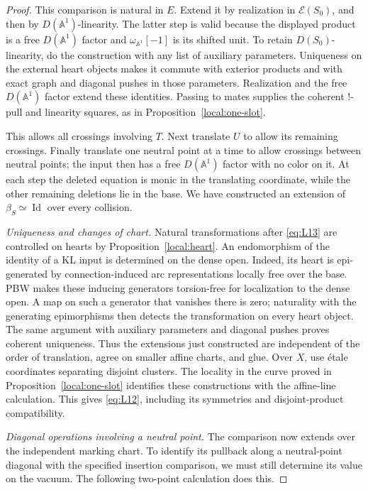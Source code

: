 \documentclass[11pt]{article}
\numberwithin{equation}{section}
\theoremstyle{definition}
\theoremstyle{remark}
\begin{document}
\begin{proof}
This comparison is natural in $E$.  Extend it by realization in
$\mathcal E(S_0)$, and then by $D(\mathbb A^1)$-linearity.  The latter
step is valid because the displayed product is a free
$D(\mathbb A^1)$ factor and $\omega_{\mathbb A^1}[-1]$ is its shifted
unit.  To retain $D(S_0)$-linearity, do the construction with any
list of auxiliary parameters.  Uniqueness on the external heart
objects makes it commute with exterior products and with exact
graph and diagonal pushes in those parameters.  Realization and
the free $D(\mathbb A^1)$ factor extend these identities.  Passing
to mates supplies the coherent !-pull and linearity squares,
as in Proposition~\ref{local:one-slot}.

This allows all crossings involving $T$.  Next translate $U$ to
allow its remaining crossings.  Finally translate one neutral
point at a time to allow crossings between neutral points; the
input then has a free $D(\mathbb A^1)$ factor with no color on it.
At each step the deleted equation is monic in the translating
coordinate, while the other remaining deletions lie in the base.
We have constructed an extension of $\beta_S\simeq\operatorname{Id}$
over every collision.

\smallskip
\noindent\emph{Uniqueness and changes of chart.}
Natural transformations after \eqref{eq:L13} are controlled on
hearts by Proposition~\ref{local:heart}.  An endomorphism of the
identity of a KL input is determined on the dense open.  Indeed,
its heart is epi-generated by connection-induced arc
representations locally free over the base.  PBW makes these
inducing generators torsion-free for localization to the dense
open.  A map on such a generator that vanishes there is zero;
naturality with the generating epimorphisms then detects the
transformation on every heart object.  The same argument with
auxiliary parameters and diagonal pushes proves coherent
uniqueness.  Thus the extensions just constructed are independent
of the order of translation, agree on smaller affine charts, and
glue.  Over $X$, use étale coordinates separating disjoint
clusters.  The locality in the curve proved in
Proposition~\ref{local:one-slot} identifies these constructions
with the affine-line calculation.  This gives \eqref{eq:L12},
including its symmetries and disjoint-product compatibility.

\smallskip
\noindent\emph{Diagonal operations involving a neutral point.}
The comparison now extends over the independent marking chart.  To
identify its pullback along a neutral-point diagonal with the
specified insertion comparison, we must still determine its value
on the vacuum.  The following two-point calculation does this.


\end{proof}
\end{document}
